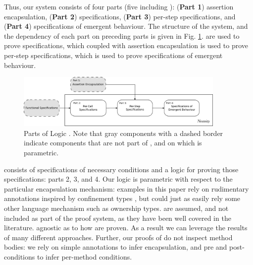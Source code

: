 {
Thus, our system} consists of four parts (five including \funcSpecs):
(\textbf{Part 1}) assertion encapsulation, (\textbf{Part 2})  specifications, 
(\textbf{Part 3}) per-step specifications, and (\textbf{Part 4}) specifications of emergent behaviour.
The structure of the system, and the dependency of each part on preceding parts is given in Fig. \ref{fig:dependency}.
 \FuncSpecs are used to prove  specifications, which coupled with 
assertion encapsulation is used to prove per-step specifications, which is used to 
prove specifications of emergent behaviour.
\begin{figure}[t]
\includegraphics[width=0.9\textwidth]{diagrams/dependency.png}
   \caption{
   Parts of \Nec Logic . 
   Note that gray components with a dashed border indicate
   components that are not part of \Nec, and on which \Nec 
   is parametric.
    }
   \label{fig:dependency}
 \end{figure}

{\Nec consists of specifications of necessary conditions and a logic for proving those specifications: parts 2, 3, and 4.
}
Our \Nec logic  is parametric with respect to the 
particular encapsulation
mechanism: examples in this paper rely on rudimentary annotations inspired by confinement types
\cite{confined}, but could just as easily rely some other language mechanism such as ownership types.
 \funcSpecs are assumed, and not 
included as part of the proof system, as they have been well covered in the literature.
{ agnostic as to how  are proven.
As a result we can leverage the results of many different approaches.
Further, our proofs of \Nec do not inspect method
bodies: we rely on simple annotations to infer encapsulation, and
 pre and post-conditions  to infer per-method conditions. }
 


